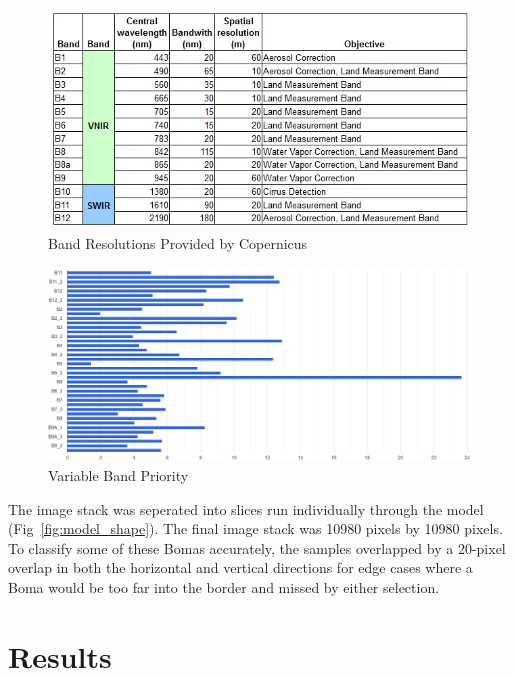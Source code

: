 \documentclass[10pt]{article}
\begin{document}
\begin{figure} [H]
    \centering
    \includegraphics[width=1\linewidth]{images/copernicus_band_resolution.png}
    \caption{Band Resolutions Provided by Copernicus}
    \label{fig:cop_bands_chart}
\end{figure}

\begin{figure} [H]
    \centering
    \includegraphics[width=1\linewidth]{images/bands importance.png}
    \caption{Variable Band Priority}
    \label{fig:band_importance}
\end{figure}

The image stack was seperated into slices run individually through the model (Fig~\ref{fig:model_shape}). The final image stack was 10980 pixels by 10980 pixels. To classify some of these Bomas accurately, the samples overlapped by a 20-pixel overlap in both the horizontal and vertical directions for edge cases where a Boma would be too far into the border and missed by either selection.


\section{Results}
\end{document}
